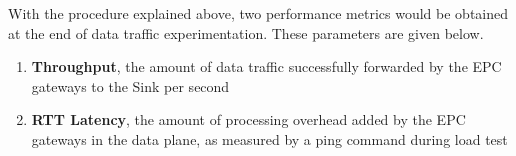\pdfminorversion=4\documentclass[hidelinks]{report}
\begin{document}
With the procedure explained above, two performance metrics would be obtained at the end of data traffic experimentation. These parameters are given below.

\begin{enumerate}

\item \textbf{Throughput}, the amount of data traffic successfully forwarded by the EPC gateways to the Sink per second

\item \textbf{RTT Latency}, the amount of processing overhead added by the EPC gateways in the data
plane, as measured by a ping command during load test

\end{enumerate}
\end{document}
